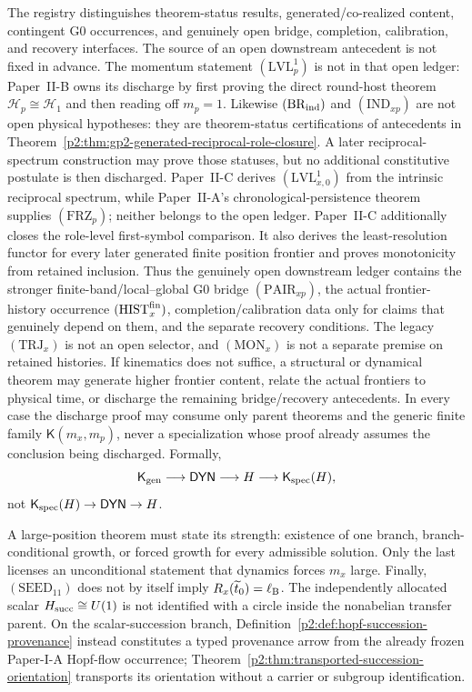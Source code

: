 \documentclass[12pt,a4paper]{article}
\begin{document}
\begin{remark}
\label{p2:rem:level-discharge-ledger}
The registry distinguishes theorem-status results, generated/co-realized
content, contingent G0 occurrences, and genuinely open bridge, completion,
calibration, and recovery interfaces.  The source of an open downstream
antecedent is not fixed in advance.
The momentum statement \((\mathrm{LVL}_p^1)\) is not in that open ledger:
Paper~II-B owns its discharge by first proving the direct round-host theorem
\(\mathcal H_p\cong\mathcal H_1\) and then reading off \(m_p=1\).
Likewise \((\mathrm{BR}_{\rm ind})\) and \((\mathrm{IND}_{xp})\) are not open
physical hypotheses: they are theorem-status certifications of antecedents in
Theorem~\ref{p2:thm:gp2-generated-reciprocal-role-closure}.  A later
reciprocal-spectrum construction may prove those statuses, but no additional
constitutive postulate is then discharged.  Paper~II-C derives
\((\mathrm{LVL}_{x,0}^1)\) from the intrinsic reciprocal spectrum, while
Paper~II-A's chronological-persistence theorem supplies
\((\mathrm{FRZ}_p)\); neither belongs to the open ledger.  Paper~II-C
additionally closes the role-level first-symbol comparison.  It also derives
the least-resolution functor for every later generated finite position
frontier and proves monotonicity from retained inclusion.  Thus the genuinely
open downstream ledger contains the stronger finite-band/local--global G0
bridge \((\mathrm{PAIR}_{xp})\), the actual frontier-history occurrence
\((\mathrm{HIST}_x^{\rm fin})\), completion/calibration data only for claims
that genuinely depend on them, and the separate recovery conditions.  The
legacy \((\mathrm{TRJ}_x)\) is not an open selector, and
\((\mathrm{MON}_x)\) is not a separate premise on retained histories.  If
kinematics does not suffice, a structural or dynamical theorem may generate
higher frontier content, relate the actual frontiers to physical time, or
discharge the remaining bridge/recovery antecedents.
In every case the discharge proof may consume only parent theorems and the
generic finite family \(\mathsf K(m_x,m_p)\), never a specialization whose
proof already assumes the conclusion being discharged.  Formally,
\[
 \mathsf K_{\rm gen}\longrightarrow\mathsf{DYN}
 \longrightarrow H\longrightarrow\mathsf K_{\rm spec}(H),
\]
not \(\mathsf K_{\rm spec}(H)\to\mathsf{DYN}\to H\).

A large-position theorem must state its strength: existence of one branch,
branch-conditional growth, or forced growth for every admissible solution.
Only the last licenses an unconditional statement that dynamics forces
\(m_x\) large.  Finally, \((\mathrm{SEED}_{11})\) does not by itself imply
\(R_x(\widetilde t_0)=\ell_{\rm B}\).  The independently allocated scalar
\(H_{\rm succ}\cong U(1)\) is not identified with a circle inside the
nonabelian transfer parent.  On the scalar-succession branch,
Definition~\ref{p2:def:hopf-succession-provenance} instead constitutes a
typed provenance arrow from the already frozen Paper-I-A Hopf-flow occurrence;
Theorem~\ref{p2:thm:transported-succession-orientation} transports its
orientation without a carrier or subgroup identification.
\end{remark}
\end{document}
